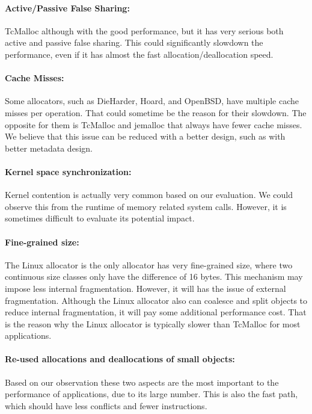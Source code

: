 \paragraph{Active/Passive False Sharing:} TcMalloc although with the good performance, but it has very serious both active and passive false sharing. This could significantly slowdown the performance, even if it has almost the fast allocation/deallocation speed.  

\paragraph{Cache Misses:} Some allocators, such as DieHarder, Hoard, and  OpenBSD, have multiple cache misses per operation. That could sometime be the reason for their slowdown. The opposite for them is TcMalloc and jemalloc that always have fewer cache misses. We believe that this issue can be reduced with a better design, such as with better metadata design.  

\paragraph{Kernel space synchronization:} Kernel contention is actually very common based on our evaluation. We could observe this from the runtime of memory related system calls.  However, it is sometimes difficult to evaluate its potential impact.

\paragraph{Fine-grained size:} The Linux allocator is the only allocator has very fine-grained size, where two continuous size classes only have the difference of 16 bytes. This mechanism may impose less internal fragmentation. However, it will has the issue of external fragmentation. Although the Linux allocator also can coalesce and split objects to reduce internal fragmentation, it will pay some additional performance cost. That is the reason why the Linux allocator is typically slower than TcMalloc for most applications.

\paragraph{Re-used allocations and deallocations of small objects:} Based on our observation these two aspects are the most important to the  performance of applications, due to its large number. This is also the fast path, which should have less conflicts and fewer instructions.  



